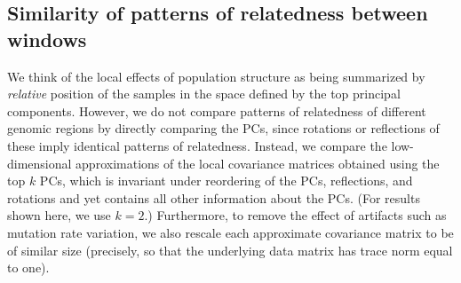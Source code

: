 \documentclass[11pt, oneside]{article}   	%
\renewcommand{\revpoint}[2]{\relax}
\begin{document}


\subsection{Similarity of patterns of relatedness between windows}

We think of the local effects of population structure as being summarized by \emph{relative} position of the samples
in the space defined by the top principal components.
However, 
we do not compare patterns of relatedness of different genomic regions by directly comparing the PCs,
since rotations or reflections of these imply identical patterns of relatedness.
Instead, we compare the low-dimensional approximations of the local covariance matrices
obtained using the top $k$ PCs,
which is invariant under reordering of the PCs, \revpoint{1}{2}
reflections, and rotations and yet contains all other information about the PCs.
(For results shown here, we use $k=2$.)
Furthermore, to remove the effect of artifacts such as mutation rate variation,
we also rescale each approximate covariance matrix to be of similar size
(precisely, so that the underlying data matrix has trace norm equal to one).
\end{document}
